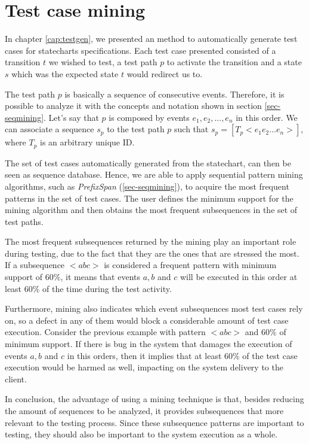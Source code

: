 \section{Test case mining}
\label{sec-testsequence}

In chapter \ref{cap:testgen}, we presented an method to automatically generate test cases for statecharts specifications. Each test case presented consisted of a transition $t$ we wished to test, a test path $p$ to activate the transition and a state $s$ which was the expected state $t$ would redirect us to.

The test path $p$ is basically a sequence of consecutive events. Therefore, it is possible to analyze it with the concepts and notation shown in section \ref{sec-seqmining}. Let's say that $p$ is composed by events $e_1,e_2,...,e_n$ in this order. We can associate a sequence $s_p$ to the test path $p$ such that $s_p = [T_p < e_1e_2...e_n >]$, where $T_p$ is an arbitrary unique ID.


The set of test cases automatically generated from the statechart, can then be seen as sequence database. Hence, we are able to apply sequential pattern mining algorithms, such as \textit{PrefixSpan} (\ref{sec-seqmining}), to acquire the most frequent patterns in the set of test cases. The user defines the minimum support for the mining algorithm and then obtains the most frequent subsequences in the set of test paths.

The most frequent subsequences returned by the mining play an important role during testing, due to the fact that they are the ones that are stressed the most. If a subsequence $< a b c >$ is considered a frequent pattern with minimum support of $60\%$, it means that events $a, b$ and $c$ will be executed in this order at least $60\%$ of the time during the test activity.

Furthermore, mining also indicates which event subsequences most test cases rely on, so a defect in any of them would block a considerable amount of test case execution. Consider the previous example with pattern $< a b c >$ and $60\%$ of minimum support. If there is bug in the system that damages the execution of events $a, b$ and $c$ in this orders, then it implies that at least $60\%$ of the test case execution would be harmed as well, impacting on the system delivery to the client.

In conclusion, the advantage of using a mining technique is that, besides reducing the amount of sequences to be analyzed, it provides subsequences that more relevant to the testing process. Since these subsequence patterns are important to testing, they should also be important to the system execution as a whole. 


